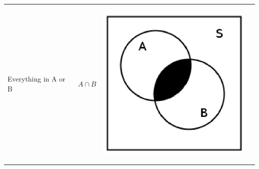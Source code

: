 \begin{center}
\begin{xtabular*}{\mytablewidth}[t]{|p{10\mystarwidth}|p{10\mystarwidth}|p{10\mystarwidth}|p{10\mystarwidth}|}
        Everything in A or B &
    
    
        \begin{math}A\cap B\end{math} &
    
    
        
    \setcounter{subfigure}{0}

\label{m39373*uid14587}
    \begin{center}
    \label{m39373*uid14587!!!underscore!!!media}\label{m39373*uid14587!!!underscore!!!printimage}\includegraphics[width=300px]{col11306.imgs/m39373_intersect.png} %
        
      \vspace{2pt}
    \vspace{.1in}
    
    \end{center}



    \addtocounter{footnote}{-0}
     \tabularnewline{}
    

\end{xtabular*}
\end{center}
